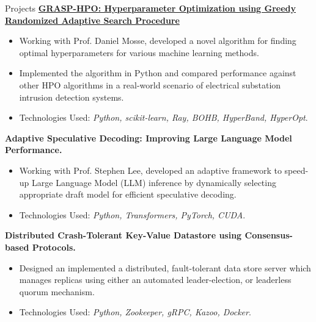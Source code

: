 \begin{resumesection}{Projects}
	\href{https://github.com/shinwookim/GRASP-HPO/}{
		\textbf{GRASP-HPO: Hyperparameter Optimization using Greedy Randomized Adaptive Search Procedure}
	}
	\vspace{-\parskip}
	\begin{itemize}
		\item Working with Prof. Daniel Mosse, developed a novel algorithm for finding optimal hyperparameters for various machine learning methods.
		\item Implemented the algorithm in Python and compared performance against other HPO algorithms in a real-world scenario of electrical substation intrusion detection systems.
		\item Technologies Used: \textit{Python, scikit-learn, Ray, BOHB, HyperBand, HyperOpt}.
	\end{itemize}

	\textbf{Adaptive Speculative Decoding: Improving Large Language Model Performance.}
	\vspace{-\parskip}
	\begin{itemize}
		\item Working with Prof. Stephen Lee, developed an adaptive framework to speed-up Large Language Model (LLM) inference by dynamically selecting appropriate draft model for efficient speculative decoding.
		\item Technologies Used: \textit{Python, Transformers, PyTorch, CUDA}.
	\end{itemize}

	\textbf{Distributed Crash-Tolerant Key-Value Datastore using Consensus-based Protocols.}
	\vspace{-\parskip}
	\begin{itemize}
		\item Designed an implemented a distributed, fault-tolerant data store server which manages replicas using either an automated leader-election, or leaderless quorum mechanism.
		\item Technologies Used: \textit{Python, Zookeeper, gRPC, Kazoo, Docker}.
	\end{itemize}
\end{resumesection}
